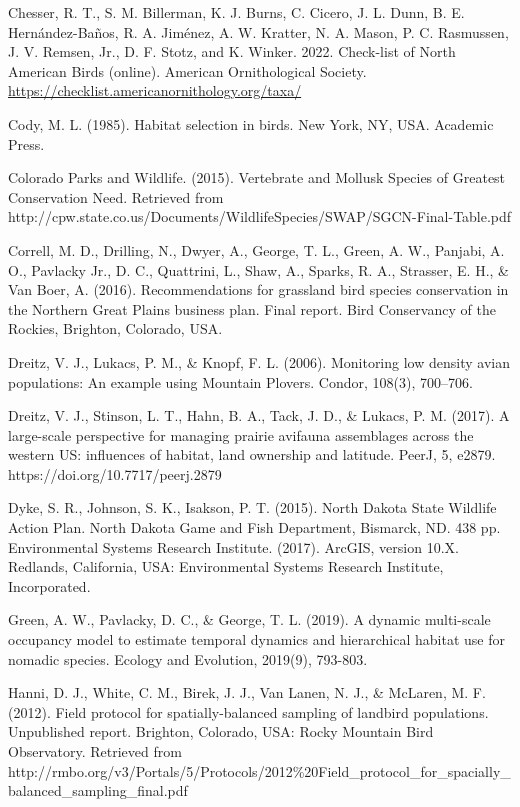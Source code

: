 \documentclass[
  letterpaper,
  DIV=11,
  numbers=noendperiod,
  oneside]{scrreprt}
\begin{document}
Chesser, R. T., S. M. Billerman, K. J. Burns, C. Cicero, J. L. Dunn, B.
E. Hernández-Baños, R. A. Jiménez, A. W. Kratter, N. A. Mason, P. C.
Rasmussen, J. V. Remsen, Jr., D. F. Stotz, and K. Winker. 2022.
Check-list of North American Birds (online). American Ornithological
Society. \url{https://checklist.americanornithology.org/taxa/}

Cody, M. L. (1985). Habitat selection in birds. New York, NY, USA.
Academic Press.

Colorado Parks and Wildlife. (2015). Vertebrate and Mollusk Species of
Greatest Conservation Need. Retrieved from
http://cpw.state.co.us/Documents/WildlifeSpecies/SWAP/SGCN-Final-Table.pdf

Correll, M. D., Drilling, N., Dwyer, A., George, T. L., Green, A. W.,
Panjabi, A. O., Pavlacky Jr., D. C., Quattrini, L., Shaw, A., Sparks, R.
A., Strasser, E. H., \& Van Boer, A. (2016). Recommendations for
grassland bird species conservation in the Northern Great Plains
business plan. Final report. Bird Conservancy of the Rockies, Brighton,
Colorado, USA.

Dreitz, V. J., Lukacs, P. M., \& Knopf, F. L. (2006). Monitoring low
density avian populations: An example using Mountain Plovers. Condor,
108(3), 700--706.

Dreitz, V. J., Stinson, L. T., Hahn, B. A., Tack, J. D., \& Lukacs, P.
M. (2017). A large-scale perspective for managing prairie avifauna
assemblages across the western US: influences of habitat, land ownership
and latitude. PeerJ, 5, e2879. https://doi.org/10.7717/peerj.2879

Dyke, S. R., Johnson, S. K., Isakson, P. T. (2015). North Dakota State
Wildlife Action Plan. North Dakota Game and Fish Department, Bismarck,
ND. 438 pp. Environmental Systems Research Institute. (2017). ArcGIS,
version 10.X. Redlands, California, USA: Environmental Systems Research
Institute, Incorporated.

Green, A. W., Pavlacky, D. C., \& George, T. L. (2019). A dynamic
multi-scale occupancy model to estimate temporal dynamics and
hierarchical habitat use for nomadic species. Ecology and Evolution,
2019(9), 793-803.

Hanni, D. J., White, C. M., Birek, J. J., Van Lanen, N. J., \& McLaren,
M. F. (2012). Field protocol for spatially-balanced sampling of landbird
populations. Unpublished report. Brighton, Colorado, USA: Rocky Mountain
Bird Observatory. Retrieved from
http://rmbo.org/v3/Portals/5/Protocols/2012\%20Field\_protocol\_for\_spacially\_balanced\_sampling\_final.pdf
\end{document}
